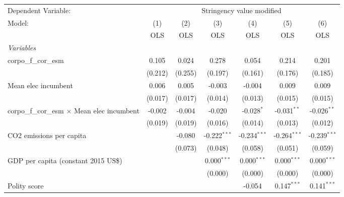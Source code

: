 
\begingroup
\centering
\begin{tabular}{lcccccc}
   \toprule
   Dependent Variable: & \multicolumn{6}{c}{Stringency value modified}\\
   Model:                                              & (1)     & (2)     & (3)            & (4)            & (5)            & (6)\\  
                                                       &  OLS    & OLS     & OLS            & OLS            & OLS            & OLS\\  
   \midrule
   \emph{Variables}\\
   corpo\_f\_cor\_esm                                  & 0.105   & 0.024   & 0.278          & 0.054          & 0.214          & 0.201\\   
                                                       & (0.212) & (0.255) & (0.197)        & (0.161)        & (0.176)        & (0.185)\\   
   Mean elec incumbent                                 & 0.006   & 0.005   & -0.003         & -0.004         & 0.009          & 0.009\\   
                                                       & (0.017) & (0.017) & (0.014)        & (0.013)        & (0.015)        & (0.015)\\   
   corpo\_f\_cor\_esm $\times$ Mean elec incumbent     & -0.002  & -0.004  & -0.020         & -0.028$^{*}$   & -0.031$^{**}$  & -0.026$^{**}$\\   
                                                       & (0.019) & (0.019) & (0.016)        & (0.014)        & (0.013)        & (0.012)\\   
   CO2 emissions per capita                            &         & -0.080  & -0.222$^{***}$ & -0.234$^{***}$ & -0.264$^{***}$ & -0.239$^{***}$\\   
                                                       &         & (0.073) & (0.048)        & (0.058)        & (0.051)        & (0.059)\\   
   GDP per capita (constant 2015 US\$)                 &         &         & 0.000$^{***}$  & 0.000$^{***}$  & 0.000$^{***}$  & 0.000$^{***}$\\   
                                                       &         &         & (0.000)        & (0.000)        & (0.000)        & (0.000)\\   
   Polity score                                        &         &         &                & -0.054         & 0.147$^{***}$  & 0.141$^{***}$\\   

\end{tabular}
